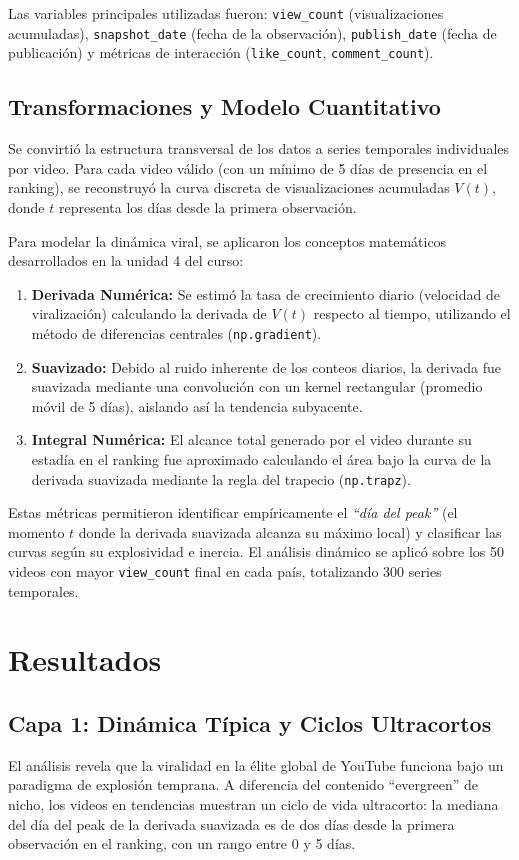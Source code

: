 \documentclass[12pt,a4paper]{article}
\begin{document}
Las variables principales utilizadas fueron: \texttt{view\_count} (visualizaciones acumuladas), \texttt{snapshot\_date} (fecha de la observación), \texttt{publish\_date} (fecha de publicación) y métricas de interacción (\texttt{like\_count}, \texttt{comment\_count}).

\subsection{Transformaciones y Modelo Cuantitativo}
Se convirtió la estructura transversal de los datos a series temporales individuales por video. Para cada video válido (con un mínimo de 5 días de presencia en el ranking), se reconstruyó la curva discreta de visualizaciones acumuladas $V(t)$, donde $t$ representa los días desde la primera observación.

Para modelar la dinámica viral, se aplicaron los conceptos matemáticos desarrollados en la unidad 4 del curso:
\begin{enumerate}
    \item \textbf{Derivada Numérica:} Se estimó la tasa de crecimiento diario (velocidad de viralización) calculando la derivada de $V(t)$ respecto al tiempo, utilizando el método de diferencias centrales (\texttt{np.gradient}).
    \item \textbf{Suavizado:} Debido al ruido inherente de los conteos diarios, la derivada fue suavizada mediante una convolución con un kernel rectangular (promedio móvil de 5 días), aislando así la tendencia subyacente.
    \item \textbf{Integral Numérica:} El alcance total generado por el video durante su estadía en el ranking fue aproximado calculando el área bajo la curva de la derivada suavizada mediante la regla del trapecio (\texttt{np.trapz}).
\end{enumerate}

Estas métricas permitieron identificar empíricamente el \textit{``día del peak''} (el momento $t$ donde la derivada suavizada alcanza su máximo local) y clasificar las curvas según su explosividad e inercia. El análisis dinámico se aplicó sobre los 50 videos con mayor \texttt{view\_count} final en cada país, totalizando 300 series temporales.

\section{Resultados}

\subsection{Capa 1: Dinámica Típica y Ciclos Ultracortos}
El análisis revela que la viralidad en la élite global de YouTube funciona bajo un paradigma de explosión temprana. A diferencia del contenido ``evergreen'' de nicho, los videos en tendencias muestran un ciclo de vida ultracorto: la mediana del día del peak de la derivada suavizada es de dos días desde la primera observación en el ranking, con un rango entre 0 y 5 días.
\end{document}

